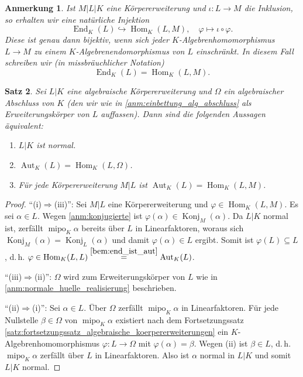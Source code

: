 \documentclass[a4paper, twoside, 11pt, ngerman]{report}
\DeclareMathOperator{\Aut}{Aut}
\DeclareMathOperator{\End}{End}
\DeclareMathOperator{\Hom}{Hom}
\DeclareMathOperator{\Konj}{Konj}
\DeclareMathOperator{\mipo}{mipo}
\theoremstyle{definistyle}
\newtheorem{satz}{Satz}[section]
\newtheorem{anm}[satz]{Anmerkung}
\theoremstyle{remark}
\begin{document}
\begin{anm}\label{anm:normalitaet_schreibweise}
Ist $M|L|K$ eine Körpererweiterung und $\iota\colon L\to M$ die Inklusion, so erhalten wir eine natürliche Injektion
\[
\End_K(L) \hookrightarrow \Hom_K(L,M), \quad \varphi \mapsto \iota\circ\varphi.
\]
Diese ist genau dann bijektiv, wenn sich jeder $K$-Algebrenhomomorphismus $L \to M$ zu einem $K$-Algebrenendomorphismus
von $L$ einschränkt. In diesem Fall schreiben wir (in missbräuchlicher Notation)
\[
\End_K(L) = \Hom_K(L,M).
\]
\end{anm}

\begin{satz}\label{satz:normale_erw_char}
Sei $L|K$ eine algebraische Körpererweiterung und $\Omega$ ein algebraischer Abschluss von $K$ (den wir wie in \ref{anm:einbettung_alg_abschluss} als Erweiterungskörper von $L$ auffassen). Dann sind die folgenden Aussagen äquivalent:
\begin{enumerate}
\item[(i)] $L|K$ ist normal.
\item[(ii)] $\Aut_K(L) = \Hom_K(L,\Omega)$.
\item[(iii)] Für jede Körpererweiterung $M|L$ ist $\Aut_K(L) = \Hom_K(L,M)$.
\end{enumerate}
\end{satz}

\begin{proof}
"`(i)$\Rightarrow$(iii)"':  
Sei $M|L$ eine Körpererweiterung und $\varphi \in \Hom_K(L,M)$.  
Es sei $\alpha \in L$. Wegen \ref{anm:konjugierte} ist $\varphi(\alpha)\in\Konj_M(\alpha)$. 
Da $L|K$ normal ist, zerfällt $\mipo_K\alpha$ bereits über $L$ in Linearfaktoren, woraus sich
$\Konj_M(\alpha)=\Konj_L(\alpha)$ und damit $\varphi(\alpha) \in L$ ergibt.  
Somit ist $\varphi(L) \subseteq L$, d.\,h. $\varphi \in \Hom_K(L,L) \overset{\ref{bem:end_ist_aut}}{=} \Aut_K(L)$.

"`(iii)$\Rightarrow$(ii)"':  
$\Omega$ wird zum Erweiterungskörper von $L$ wie in \ref{anm:normale_huelle_realisierung} beschrieben.

"`(ii)$\Rightarrow$(i)"':  
Sei $\alpha \in L$. Über $\Omega$ zerfällt $\mipo_K\alpha$ in Linearfaktoren. 
Für jede Nullstelle $\beta \in \Omega$ von $\mipo_K\alpha$ existiert nach dem Fortsetzungssatz \ref{satz:fortsetzungssatz_algebraische_koerpererweiterungen} ein $K$-Algebrenhomomorphismus $\varphi\colon L \to \Omega$ mit $\varphi(\alpha)=\beta$. Wegen (ii) ist $\beta \in L$, d.\,h. $\mipo_K\alpha$ zerfällt über $L$ in Linearfaktoren. Also ist $\alpha$ normal in $L|K$ und somit $L|K$ normal.
\end{proof}
\end{document}
